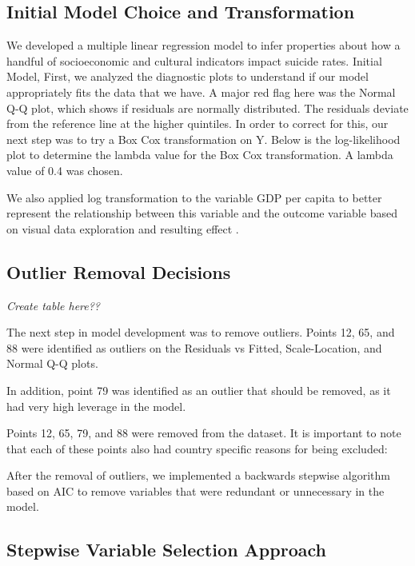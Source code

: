 \documentclass[]{article}
\begin{document}
\subsection{Initial Model Choice and
Transformation}\label{initial-model-choice-and-transformation}

We developed a multiple linear regression model to infer properties
about how a handful of socioeconomic and cultural indicators impact
suicide rates. Initial Model, First, we analyzed the diagnostic plots to
understand if our model appropriately fits the data that we have. A
major red flag here was the Normal Q-Q plot, which shows if residuals
are normally distributed. The residuals deviate from the reference line
at the higher quintiles. In order to correct for this, our next step was
to try a Box Cox transformation on Y. Below is the log-likelihood plot
to determine the lambda value for the Box Cox transformation. A lambda
value of 0.4 was chosen.

We also applied log transformation to the variable GDP per capita to
better represent the relationship between this variable and the outcome
variable based on visual data exploration and resulting effect .

\subsection{Outlier Removal Decisions}\label{outlier-removal-decisions}

\emph{Create table here??}

The next step in model development was to remove outliers. Points 12,
65, and 88 were identified as outliers on the Residuals vs Fitted,
Scale-Location, and Normal Q-Q plots.

In addition, point 79 was identified as an outlier that should be
removed, as it had very high leverage in the model.

Points 12, 65, 79, and 88 were removed from the dataset. It is important
to note that each of these points also had country specific reasons for
being excluded:

After the removal of outliers, we implemented a backwards stepwise
algorithm based on AIC to remove variables that were redundant or
unnecessary in the model.

\subsection{Stepwise Variable Selection
Approach}\label{stepwise-variable-selection-approach}
\end{document}
